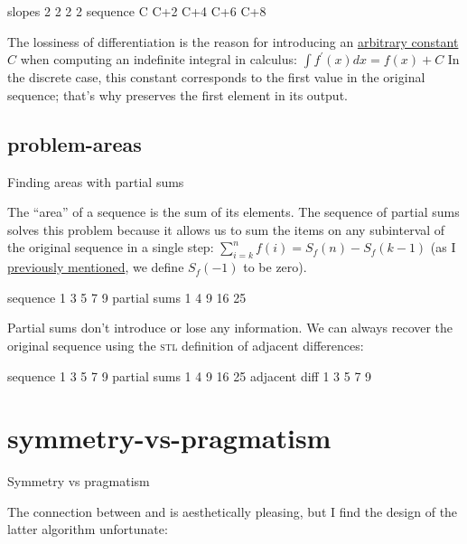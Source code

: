 \documentclass{article}
\begin{document}
\begin{code}
  slopes       2    2    2    2
sequence  C  C+2  C+4  C+6  C+8
\end{code}

The lossiness of differentiation is the reason for introducing an \href{https://en.wikipedia.org/wiki/Constant_of_integration}{arbitrary constant} $C$
when computing an indefinite integral in calculus:
$\int f^\prime(x) dx = f(x) + C$
In the discrete case, this constant corresponds to the first value in the original sequence;
that's why  preserves the first element in its output.

\subsection{problem-areas}{Finding areas with partial sums}

The ``area'' of a sequence is the sum of its elements.
The sequence of partial sums solves this problem
because it allows us to sum the items on any subinterval of the original sequence in a single step:
$\sum_{i=k}^n f(i) = S_f(n) - S_f(k - 1)$
(as I \href{#off-by-one}{previously mentioned}, we define $S_f(-1)$ to be zero).

\begin{code}
    sequence  1   3   5   7   9
partial sums  1   4   9  16  25
\end{code}

Partial sums don't introduce or lose any information.
We can always recover the original sequence using the \textsc{stl} definition of adjacent differences:

\begin{code}
     sequence  1   3   5   7   9
 partial sums  1   4   9  16  25
adjacent diff  1   3   5   7   9
\end{code}

\section{symmetry-vs-pragmatism}{Symmetry vs pragmatism}

The connection between  and  is aesthetically pleasing,
but I find the design of the latter algorithm unfortunate:
\end{document}
